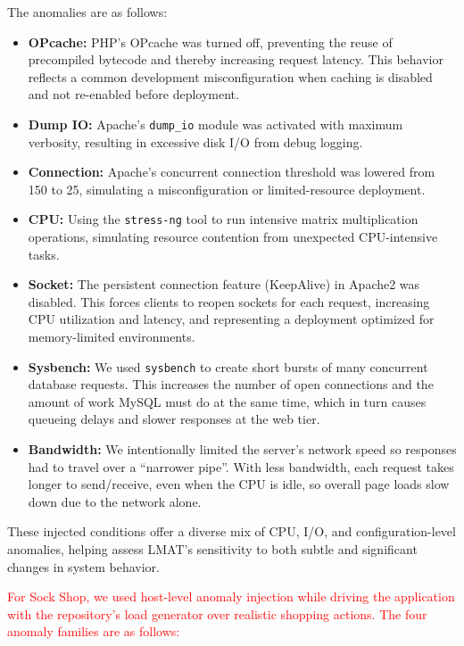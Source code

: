 \documentclass[preprint,12pt]{elsarticle}
\begin{document}
The anomalies are as follows:

\begin{itemize}
    \item \textbf{OPcache:} PHP's OPcache was turned off, preventing the reuse of precompiled bytecode and thereby increasing request latency. This behavior reflects a common development misconfiguration when caching is disabled and not re-enabled before deployment.
    \item \textbf{Dump IO:} Apache’s \texttt{dump\_io} module was activated with maximum verbosity, resulting in excessive disk I/O from debug logging.
    \item \textbf{Connection:} Apache’s concurrent connection threshold was lowered from 150 to 25, simulating a misconfiguration or limited-resource deployment.
    \item \textbf{CPU:} Using the \texttt{stress-ng} tool to run intensive matrix multiplication operations, simulating resource contention from unexpected CPU-intensive tasks.
    \item \textbf{Socket:} The persistent connection feature (KeepAlive) in Apache2 was disabled. This forces clients to reopen sockets for each request, increasing CPU utilization and latency, and representing a deployment optimized for memory-limited environments.
    \item \textbf{Sysbench:} We used \texttt{sysbench} to create short bursts of many concurrent database requests. This increases the number of open connections and the amount of work MySQL must do at the same time, which in turn causes queueing delays and slower responses at the web tier.
    \item \textbf{Bandwidth:} We intentionally limited the server’s network speed so responses had to travel over a “narrower pipe”. With less bandwidth, each request takes longer to send/receive, even when the CPU is idle, so overall page loads slow down due to the network alone.
\end{itemize}

These injected conditions offer a diverse mix of CPU, I/O, and configuration-level anomalies, helping assess LMAT’s sensitivity to both subtle and significant changes in system behavior.


\textcolor{red}{For Sock Shop, we used host-level anomaly injection while driving the application with the repository's load generator over realistic shopping actions. The four anomaly families are as follows:}
\end{document}
